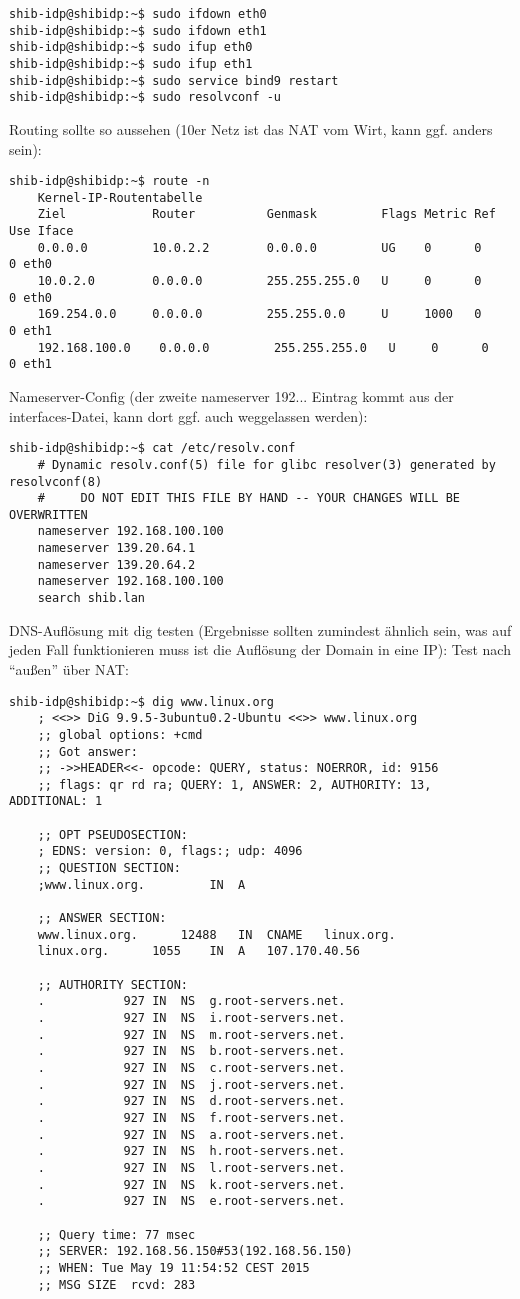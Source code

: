 \begin{lstlisting}
shib-idp@shibidp:~$ sudo ifdown eth0
shib-idp@shibidp:~$ sudo ifdown eth1
shib-idp@shibidp:~$ sudo ifup eth0
shib-idp@shibidp:~$ sudo ifup eth1
shib-idp@shibidp:~$ sudo service bind9 restart
shib-idp@shibidp:~$ sudo resolvconf -u
\end{lstlisting}
Routing sollte so aussehen (10er Netz ist das NAT vom Wirt, kann ggf. anders sein):
\begin{lstlisting}
shib-idp@shibidp:~$ route -n
	Kernel-IP-Routentabelle
	Ziel            Router          Genmask         Flags Metric Ref    Use Iface
	0.0.0.0         10.0.2.2        0.0.0.0         UG    0      0        0 eth0
	10.0.2.0        0.0.0.0         255.255.255.0   U     0      0        0 eth0
	169.254.0.0     0.0.0.0         255.255.0.0     U     1000   0        0 eth1
	192.168.100.0    0.0.0.0         255.255.255.0   U     0      0        0 eth1
\end{lstlisting}
Nameserver-Config (der zweite nameserver 192... Eintrag kommt aus der interfaces-Datei, kann dort ggf. auch weggelassen werden):
\begin{lstlisting}
shib-idp@shibidp:~$ cat /etc/resolv.conf
	# Dynamic resolv.conf(5) file for glibc resolver(3) generated by resolvconf(8)
	#     DO NOT EDIT THIS FILE BY HAND -- YOUR CHANGES WILL BE OVERWRITTEN
	nameserver 192.168.100.100
	nameserver 139.20.64.1
	nameserver 139.20.64.2
	nameserver 192.168.100.100
	search shib.lan
\end{lstlisting}
DNS-Auflösung mit dig testen (Ergebnisse sollten zumindest ähnlich sein, was auf jeden Fall funktionieren muss ist die Auflösung der Domain in eine IP):
 Test nach "`außen"' über NAT:
\begin{lstlisting}
shib-idp@shibidp:~$ dig www.linux.org
	; <<>> DiG 9.9.5-3ubuntu0.2-Ubuntu <<>> www.linux.org
	;; global options: +cmd
	;; Got answer:
	;; ->>HEADER<<- opcode: QUERY, status: NOERROR, id: 9156
	;; flags: qr rd ra; QUERY: 1, ANSWER: 2, AUTHORITY: 13, ADDITIONAL: 1

	;; OPT PSEUDOSECTION:
	; EDNS: version: 0, flags:; udp: 4096
	;; QUESTION SECTION:
	;www.linux.org.			IN	A

	;; ANSWER SECTION:
	www.linux.org.		12488	IN	CNAME	linux.org.
	linux.org.		1055	IN	A	107.170.40.56

	;; AUTHORITY SECTION:
	.			927	IN	NS	g.root-servers.net.
	.			927	IN	NS	i.root-servers.net.
	.			927	IN	NS	m.root-servers.net.
	.			927	IN	NS	b.root-servers.net.
	.			927	IN	NS	c.root-servers.net.
	.			927	IN	NS	j.root-servers.net.
	.			927	IN	NS	d.root-servers.net.
	.			927	IN	NS	f.root-servers.net.
	.			927	IN	NS	a.root-servers.net.
	.			927	IN	NS	h.root-servers.net.
	.			927	IN	NS	l.root-servers.net.
	.			927	IN	NS	k.root-servers.net.
	.			927	IN	NS	e.root-servers.net.

	;; Query time: 77 msec
	;; SERVER: 192.168.56.150#53(192.168.56.150)
	;; WHEN: Tue May 19 11:54:52 CEST 2015
	;; MSG SIZE  rcvd: 283

\end{lstlisting}
